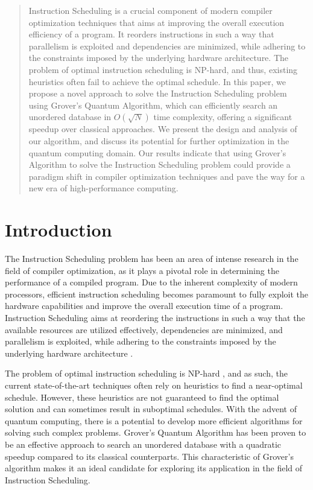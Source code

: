 \begin{abstract}
Instruction Scheduling is a crucial component of modern compiler optimization techniques that aims at improving the overall execution efficiency of a program. It reorders instructions in such a way that parallelism is exploited and dependencies are minimized, while adhering to the constraints imposed by the underlying hardware architecture. The problem of optimal instruction scheduling is NP-hard, and thus, existing heuristics often fail to achieve the optimal schedule. In this paper, we propose a novel approach to solve the Instruction Scheduling problem using Grover's Quantum Algorithm, which can efficiently search an unordered database in $O(\sqrt{N})$ time complexity, offering a significant speedup over classical approaches. We present the design and analysis of our algorithm, and discuss its potential for further optimization in the quantum computing domain. Our results indicate that using Grover's Algorithm to solve the Instruction Scheduling problem could provide a paradigm shift in compiler optimization techniques and pave the way for a new era of high-performance computing.
\end{abstract}

\section{Introduction}

The Instruction Scheduling problem has been an area of intense research in the field of compiler optimization, as it plays a pivotal role in determining the performance of a compiled program. Due to the inherent complexity of modern processors, efficient instruction scheduling becomes paramount to fully exploit the hardware capabilities and improve the overall execution time of a program. Instruction Scheduling aims at reordering the instructions in such a way that the available resources are utilized effectively, dependencies are minimized, and parallelism is exploited, while adhering to the constraints imposed by the underlying hardware architecture \cite{gibbons1990instruction}.

The problem of optimal instruction scheduling is NP-hard \cite{sethi1977optimal}, and as such, the current state-of-the-art techniques often rely on heuristics to find a near-optimal schedule. However, these heuristics are not guaranteed to find the optimal solution and can sometimes result in suboptimal schedules. With the advent of quantum computing, there is a potential to develop more efficient algorithms for solving such complex problems. Grover's Quantum Algorithm \cite{grover1996fast} has been proven to be an effective approach to search an unordered database with a quadratic speedup compared to its classical counterparts. This characteristic of Grover's algorithm makes it an ideal candidate for exploring its application in the field of Instruction Scheduling.

